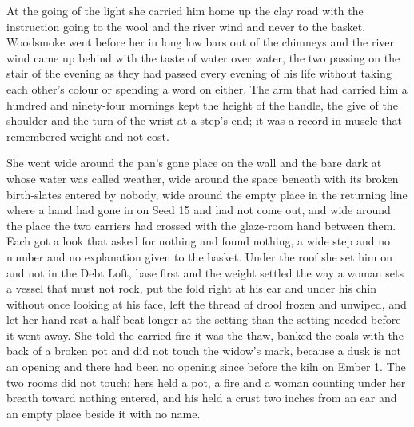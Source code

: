 At the going of the light she carried him home up the clay road with the instruction going to the wool and the river wind and never to the basket. Woodsmoke went before her in long low bars out of the chimneys and the river wind came up behind with the taste of water over water, the two passing on the stair of the evening as they had passed every evening of his life without taking each other's colour or spending a word on either. The arm that had carried him a hundred and ninety-four mornings kept the height of the handle, the give of the shoulder and the turn of the wrist at a step's end; it was a record in muscle that remembered weight and not cost.

She went wide around the pan's gone place on the wall and the bare dark  at  whose water was called weather, wide around the space beneath  with its broken birth-slates entered by nobody, wide around the empty place in the returning line where a hand had gone in on Seed 15 and had not come out, and wide around the place the two carriers had crossed with the glaze-room hand between them. Each got a look that asked for nothing and found nothing, a wide step and no number and no explanation given to the basket. Under the roof she set him on  and not in the Debt Loft, base first and the weight settled the way a woman sets a vessel that must not rock, put the fold right at his ear and under his chin without once looking at his face, left the thread of drool frozen and unwiped, and let her hand rest a half-beat longer at the setting than the setting needed before it went away. She told the carried fire it was the thaw, banked the coals with the back of a broken pot and did not touch the widow's mark, because a dusk is not an opening and there had been no opening since before the kiln on Ember 1. The two rooms did not touch: hers held a pot, a fire and a woman counting under her breath toward nothing entered, and his held a crust two inches from an ear and an empty place beside it with no name.

\scenebreak

